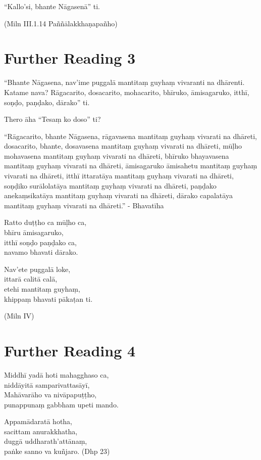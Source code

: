 “Kallo’si, bhante Nāgasenā” ti.

(Miln III.1.14 Paññālakkhaṇapañho)

\section*{Further Reading 3}

“Bhante Nāgasena, nav’ime puggalā mantitaṃ guyhaṃ vivaranti na dhārenti. Katame nava? Rāgacarito, dosacarito, mohacarito, bhīruko, āmisagaruko, itthī, soṇḍo, paṇḍako, dārako” ti.

Thero āha “Tesaṃ ko doso” ti?

“Rāgacarito, bhante Nāgasena, rāgavasena mantitaṃ guyhaṃ vivarati na dhāreti, dosacarito, bhante, dosavasena mantitaṃ guyhaṃ vivarati na dhāreti, mūḷho mohavasena mantitaṃ guyhaṃ vivarati na dhāreti, bhīruko bhayavasena mantitaṃ guyhaṃ vivarati na dhāreti, āmisagaruko āmisahetu mantitaṃ guyhaṃ vivarati na dhāreti, itthī ittaratāya mantitaṃ guyhaṃ vivarati na dhāreti, soṇḍiko surālolatāya mantitaṃ guyhaṃ vivarati na dhāreti, paṇḍako anekaṃsikatāya mantitaṃ guyhaṃ vivarati na dhāreti, dārako capalatāya mantitaṃ guyhaṃ vivarati na dhāreti.” - Bhavatīha

Ratto duṭṭho ca mūḷho ca,\\
bhīru āmisagaruko,\\
itthī soṇḍo paṇḍako ca,\\
navamo bhavati dārako.

Nav’ete puggalā loke,\\
ittarā calitā calā,\\
etehi mantitaṃ guyhaṃ,\\
khippaṃ bhavati pākaṭan ti.

(Miln IV)

\section*{Further Reading 4}

Middhī yadā hoti mahagghaso ca,\\
niddāyitā samparivattasāyī,\\
Mahāvarāho va nivāpapuṭṭho,\\
punappunaṃ gabbham upeti mando.

Appamādaratā hotha,\\
sacittam anurakkhatha,\\
duggā uddharath’attānaṃ,\\
paṅke sanno va kuñjaro. (Dhp 23)